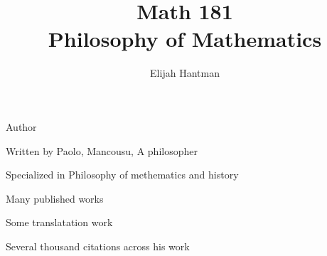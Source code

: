\documentclass{report}
\title{\Huge{Math 181}\\Philosophy of Mathematics}
\author{\huge{Elijah Hantman}}
\date{}
\begin{document}
\maketitle
\newpage

\begin{description}
    \item Author 
        \begin{mdframed}
            Written by Paolo, Mancousu, A philosopher

            Specialized in Philosophy of methematics and
            history

            Many published works

            Some translatation work

            Several thousand citations across his work
        \end{mdframed}
\end{description}
\end{document}
